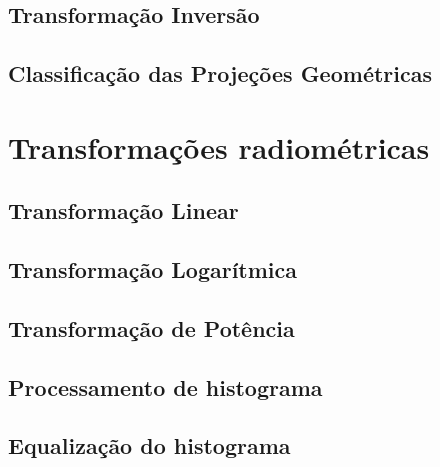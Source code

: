 \documentclass[
  brazilian,
]{book}
\begin{document}
\hypertarget{transformauxe7uxe3o-inversuxe3o}{%
\section{Transformação Inversão}\label{transformauxe7uxe3o-inversuxe3o}}

\hypertarget{classificauxe7uxe3o-das-projeuxe7uxf5es-geomuxe9tricas}{%
\section{Classificação das Projeções Geométricas}\label{classificauxe7uxe3o-das-projeuxe7uxf5es-geomuxe9tricas}}

\hypertarget{transformauxe7uxf5es-radiomuxe9tricas}{%
\chapter{Transformações radiométricas}\label{transformauxe7uxf5es-radiomuxe9tricas}}

\hypertarget{transformauxe7uxe3o-linear}{%
\section{Transformação Linear}\label{transformauxe7uxe3o-linear}}

\hypertarget{transformauxe7uxe3o-logaruxedtmica}{%
\section{Transformação Logarítmica}\label{transformauxe7uxe3o-logaruxedtmica}}

\hypertarget{transformauxe7uxe3o-de-potuxeancia}{%
\section{Transformação de Potência}\label{transformauxe7uxe3o-de-potuxeancia}}

\hypertarget{processamento-de-histograma}{%
\section{Processamento de histograma}\label{processamento-de-histograma}}

\hypertarget{equalizauxe7uxe3o-do-histograma}{%
\section{Equalização do histograma}\label{equalizauxe7uxe3o-do-histograma}}
\end{document}
